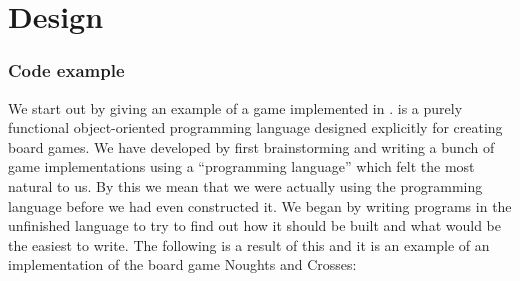 \chapter{Design}
\label{chap:design}


\subsection*{Code example}
\label{codesample}

We start out by giving an example of a game implemented in \productname{}. \productname{} is a purely functional object-oriented programming language designed explicitly for creating board games. We have developed \productname{} by first brainstorming and writing a bunch of
game implementations using a ``programming language'' which felt the most natural to us. By this we mean that we were actually using the programming
language before we had even constructed it. We began by writing programs in the unfinished language to try to find out how it should be built and what would be the easiest to write. The following is a result of this and it is an example of an implementation of the board game Noughts and Crosses:


